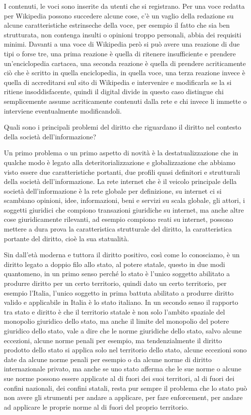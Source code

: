 I contenuti, le voci sono inserite da utenti che si registrano. Per una voce redatta per Wikipedia possono succedere alcune cose, c'è un vaglio della redazione su alcune caratteristiche estrinseche della voce, per esempio il fatto che sia ben strutturata, non contenga insulti o opinioni troppo personali, abbia dei requisiti minimi. Davanti a una voce di Wikipedia però si può avere una reazione di due tipi o forse tre, una prima reazione è quella di ritenere insufficiente e prendere un'enciclopedia cartacea, una seconda reazione è quella di prendere acriticamente ciò che è scritto in quella enciclopedia, in quella voce, una terza reazione invece è quella di accreditarsi sul sito di Wikipedia e intervenire e modificarla se la si ritiene insoddisfacente, quindi il digital divide in questo caso distingue chi semplicemente assume acriticamente contenuti dalla rete e chi invece li immette o interviene eventualmente modificandoli. \par
Quali sono i principali problemi del diritto che riguardano il diritto nel contesto della società dell'informazione?\par
Un primo problema o un primo aspetto di novità è la destatualizzazione che in qualche modo è legato alla deteritorializzazione e globalizzazione che abbiamo visto essere due caratteristiche portanti, due profili quasi definitori e strutturali della società dell'informazione. La rete internet che è il veicolo principale della società dell'informazione è la rete globale per definizione, su internet ci si scambiano opinioni, idee, informazioni, beni e servizi su scala globale, gli attori, i soggetti giuridici che compiono transazioni giuridiche su internet, ma anche altre cose giuridicamente rilevanti, ad esempio compiono reati su internet, possono mettere a dura prova la caratteristica strutturale del diritto, la caratteristica portante del diritto, cioè la sua statualità. \par 
Sin dall'età moderna e tuttora il diritto positivo, così come lo conosciamo, è un diritto legato a doppio filo allo stato, al potere statale, questo in due modi quantomeno, in un primo senso perché lo stato è l'unico soggetto abilitato a produrre diritto per un certo territorio, quindi dato un certo territorio, per esempio l'Italia, l'unico soggetto in prima battuta abilitato a produrre diritto valido e applicabile in Italia è lo stato italiano. In un secondo senso il rapporto tra stato e diritto è che il territorio statale è non solo l'ambito spaziale del monopolio giuridico dello stato, ma anche il limite del monopolio del potere giuridico dello stato, vale a dire che le norme giuridiche dello stato, salvo alcune eccezioni, alcune norme penali per esempio, ma tendenzialmente il diritto prodotto dello stato si applica solo nel territorio dello stato, alcune eccezioni sono date da alcune norme penali per esempio o da alcune norme di diritto internazionale privato, ma anche se uno stato afferma che le sue norme o alcune sue norme possono essere applicate al di fuori dei suoi territori, al di fuori dei confini nazionali, dei confini statali, resta pur sempre il problema che lo stato può non avere gli strumenti per andare a applicare, per fare enforcement, per andare ad applicare le proprie norme al di fuori del proprio territorio.\par
